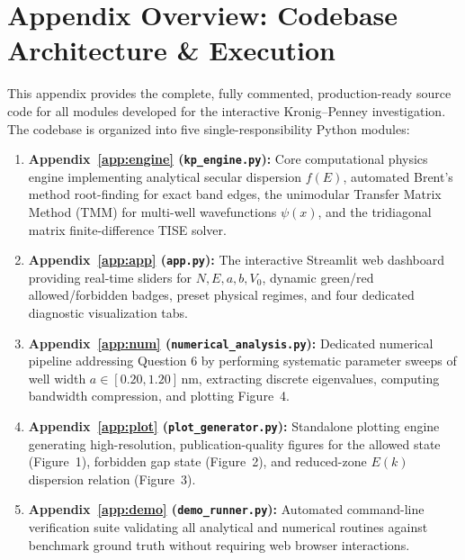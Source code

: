 \documentclass[10pt, a4paper]{article}
\begin{document}

\clearpage
\appendix
{}

\section*{Appendix Overview: Codebase Architecture \& Execution}

This appendix provides the complete, fully commented, production-ready source code for all modules developed for the interactive Kronig--Penney investigation. The codebase is organized into five single-responsibility Python modules:

\begin{enumerate}
    \item \textbf{Appendix~\ref{app:engine} (\texttt{kp\_engine.py}):} Core computational physics engine implementing analytical secular dispersion $f(E)$, automated Brent's method root-finding for exact band edges, the unimodular Transfer Matrix Method (TMM) for multi-well wavefunctions $\psi(x)$, and the tridiagonal matrix finite-difference TISE solver.
    \item \textbf{Appendix~\ref{app:app} (\texttt{app.py}):} The interactive Streamlit web dashboard providing real-time sliders for $N, E, a, b, V_0$, dynamic green/red allowed/forbidden badges, preset physical regimes, and four dedicated diagnostic visualization tabs.
    \item \textbf{Appendix~\ref{app:num} (\texttt{numerical\_analysis.py}):} Dedicated numerical pipeline addressing Question 6 by performing systematic parameter sweeps of well width $a \in [0.20, 1.20]$\,nm, extracting discrete eigenvalues, computing bandwidth compression, and plotting Figure~4.
    \item \textbf{Appendix~\ref{app:plot} (\texttt{plot\_generator.py}):} Standalone plotting engine generating high-resolution, publication-quality figures for the allowed state (Figure~1), forbidden gap state (Figure~2), and reduced-zone $E(k)$ dispersion relation (Figure~3).
    \item \textbf{Appendix~\ref{app:demo} (\texttt{demo\_runner.py}):} Automated command-line verification suite validating all analytical and numerical routines against benchmark ground truth without requiring web browser interactions.
\end{enumerate}
\end{document}
